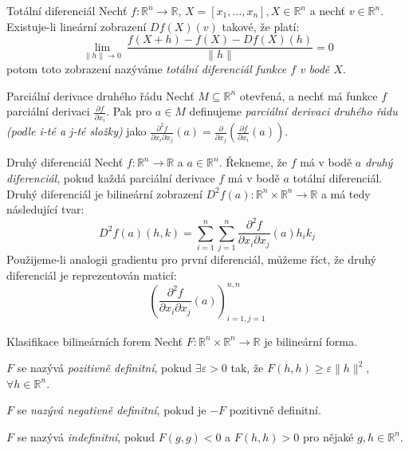 \begin{definiceN}{Totální diferenciál}
Nechť $f: \mathbb{R}^n \rightarrow \mathbb{R}$, $X = [x_1, \ldots, x_n], X \in \mathbb{R}^n$ a nechť $v \in \mathbb{R}^n$. Existuje-li lineární zobrazení $Df(X)(v)$ takové, že platí:
$$\displaystyle\lim_{\|h\| \rightarrow 0}~\frac{f(X + h) - f(X) - Df(X)(h)}{\|h\|} = 0$$
\noindent potom toto zobrazení nazýváme \textit{totální diferenciál funkce $f$ v bodě $X$}.
\end{definiceN}

\begin{definiceN}{Parciální derivace druhého řádu}
Nechť $M \subseteq \mathbb{R}^n$ otevřená, a nechť má funkce $f$ parciální derivaci $\frac{\partial f}{\partial x_i}$. Pak pro $a \in M$ definujeme \textit{parciální derivaci druhého řádu (podle i-té a j-té složky)} jako $\frac{\partial^2f}{\partial x_i \partial x_j}(a) = \frac{\partial}{\partial x_j} (\frac{\partial f}{\partial x_i}(a))$.
\end{definiceN}

\begin{definiceN}{Druhý diferenciál}
Nechť $f: \mathbb{R}^n \rightarrow \mathbb{R}$ a $a \in \mathbb{R}^n$. Řekneme, že $f$ má v bodě $a$ \textit{druhý diferenciál}, pokud každá parciální derivace $f$ má v bodě $a$ totální diferenciál. Druhý diferenciál je bilineární zobrazení $D^2f(a): \mathbb{R}^n \times \mathbb{R}^n \rightarrow \mathbb{R}$ a má tedy následující tvar:
$$D^2f(a)(h, k) = \sum_{i=1}^n\sum_{j=1}^n\frac{\partial^2f}{\partial x_i \partial x_j}(a)h_ik_j$$
Použijeme-li analogii gradientu pro první diferenciál, můžeme říct, že druhý diferenciál je reprezentován maticí:
\begin{equation}
\left(
\frac{\partial^2 f}{\partial x_i \partial x_j}(a)
\right)
^{n, n}
_{i = 1, j = 1}
\end{equation}
\end{definiceN}

\begin{definiceN}{Klasifikace bilineárních forem}
Nechť $F: \mathbb{R}^n \times \mathbb{R}^n \rightarrow \mathbb{R}$ je bilineární forma.
\begin{pitemize}
\item $F$ se nazývá \textit{pozitivně definitní}, pokud $\exists \varepsilon > 0$ tak, že $F(h, h) \geq \varepsilon\| h \|^2$, $\forall h \in \mathbb{R}^n$.
\item $F$ se \textit{nazývá negativně definitní}, pokud je $-F$ pozitivně definitní.
\item $F$ se nazývá \textit{indefinitní}, pokud $F(g,g) < 0$ a $F(h,h) > 0$ pro nějaké $g, h \in \mathbb{R}^n$.
\end{pitemize}
\end{definiceN}

